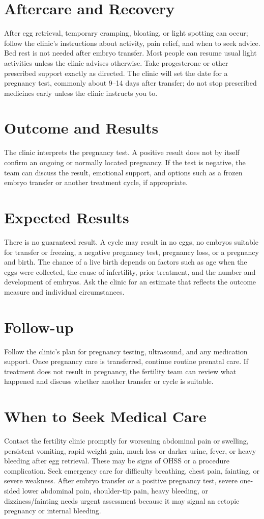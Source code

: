 \section*{Aftercare and Recovery}
After egg retrieval, temporary cramping, bloating, or light spotting can occur; follow the clinic's instructions about activity, pain relief, and when to seek advice. Bed rest is not needed after embryo transfer. Most people can resume usual light activities unless the clinic advises otherwise. Take progesterone or other prescribed support exactly as directed. The clinic will set the date for a pregnancy test, commonly about 9–14 days after transfer; do not stop prescribed medicines early unless the clinic instructs you to.

\section*{Outcome and Results}
The clinic interprets the pregnancy test. A positive result does not by itself confirm an ongoing or normally located pregnancy. If the test is negative, the team can discuss the result, emotional support, and options such as a frozen embryo transfer or another treatment cycle, if appropriate.

\section*{Expected Results}
There is no guaranteed result. A cycle may result in no eggs, no embryos suitable for transfer or freezing, a negative pregnancy test, pregnancy loss, or a pregnancy and birth. The chance of a live birth depends on factors such as age when the eggs were collected, the cause of infertility, prior treatment, and the number and development of embryos. Ask the clinic for an estimate that reflects the outcome measure and individual circumstances.

\section*{Follow-up}
Follow the clinic's plan for pregnancy testing, ultrasound, and any medication support. Once pregnancy care is transferred, continue routine prenatal care. If treatment does not result in pregnancy, the fertility team can review what happened and discuss whether another transfer or cycle is suitable.

\section*{When to Seek Medical Care}
Contact the fertility clinic promptly for worsening abdominal pain or swelling, persistent vomiting, rapid weight gain, much less or darker urine, fever, or heavy bleeding after egg retrieval. These may be signs of OHSS or a procedure complication. Seek emergency care for difficulty breathing, chest pain, fainting, or severe weakness. After embryo transfer or a positive pregnancy test, severe one-sided lower abdominal pain, shoulder-tip pain, heavy bleeding, or dizziness/fainting needs urgent assessment because it may signal an ectopic pregnancy or internal bleeding.

